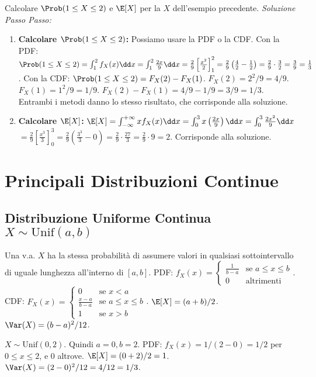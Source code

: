 \begin{example}
Calcolare $\Prob(1 \le X \le 2)$ e $\E[X]$ per la $X$ dell'esempio precedente.
\textit{Soluzione Passo Passo:}
\begin{enumerate}
    \item \textbf{Calcolare $\Prob(1 \le X \le 2)$:}
    Possiamo usare la PDF o la CDF.
    Con la PDF: $\Prob(1 \le X \le 2) = \int_1^2 f_X(x) \dd x = \int_1^2 \frac{2x}{9} \dd x = \frac{2}{9} \left[ \frac{x^2}{2} \right]_1^2 = \frac{2}{9} \left( \frac{4}{2} - \frac{1}{2} \right) = \frac{2}{9} \cdot \frac{3}{2} = \frac{3}{9} = \frac{1}{3}$.
    Con la CDF: $\Prob(1 \le X \le 2) = F_X(2) - F_X(1)$.
    $F_X(2) = 2^2/9 = 4/9$.
    $F_X(1) = 1^2/9 = 1/9$.
    $F_X(2) - F_X(1) = 4/9 - 1/9 = 3/9 = 1/3$.
    Entrambi i metodi danno lo stesso risultato, che corrisponde alla soluzione.
    \item \textbf{Calcolare $\E[X]$:}
    $\E[X] = \int_{-\infty}^{+\infty} x f_X(x) \dd x = \int_0^3 x \left(\frac{2x}{9}\right) \dd x = \int_0^3 \frac{2x^2}{9} \dd x$
    $= \frac{2}{9} \left[ \frac{x^3}{3} \right]_0^3 = \frac{2}{9} \left( \frac{3^3}{3} - 0 \right) = \frac{2}{9} \cdot \frac{27}{3} = \frac{2}{9} \cdot 9 = 2$.
    Corrisponde alla soluzione.
\end{enumerate}
\end{example}

\section{Principali Distribuzioni Continue}

\subsection{Distribuzione Uniforme Continua \texorpdfstring{$X \sim \text{Unif}(a,b)$}{X ~ Unif(a,b)}}
Una v.a. $X$ ha la stessa probabilità di assumere valori in qualsiasi sottointervallo di uguale lunghezza all'interno di $[a,b]$.
PDF: $f_X(x) = \begin{cases} \frac{1}{b-a} & \text{se } a \le x \le b \\ 0 & \text{altrimenti} \end{cases}$.
CDF: $F_X(x) = \begin{cases} 0 & \text{se } x < a \\ \frac{x-a}{b-a} & \text{se } a \le x \le b \\ 1 & \text{se } x > b \end{cases}$.
$\E[X] = (a+b)/2$.
$\Var(X) = (b-a)^2/12$.
\begin{example}[Esercizio 3, 17/07/2024]
$X \sim \text{Unif}(0,2)$.
Quindi $a=0, b=2$.
PDF: $f_X(x) = 1/(2-0) = 1/2$ per $0 \le x \le 2$, e 0 altrove.
$\E[X] = (0+2)/2 = 1$.
$\Var(X) = (2-0)^2/12 = 4/12 = 1/3$.
\end{example}

